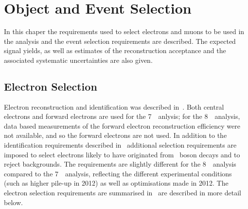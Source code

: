 \graphicspath{{Chapters/ObjEventSelection/Figures/}}
\chapter{Object and Event Selection}
\label{chap:ObjEventSelection}

In this chaper the requirements used to select electrons and muons to
be used in the analysis and the event selection requirements are described. The
expected signal yields, as well as estimates of the reconstruction acceptance
and the associated systematic uncertainties are also given.

\section{Electron Selection}
\label{sec:objsel-el}

Electron reconstruction and identification was described in~. Both
central electrons 
and forward electrons are used for the 7~\tev\ anlysis; for the 8~\tev\
analysis,
data based measurements of the forward electron reconstruction efficiency were
not available, and so the forward electrons are not used. In
addition to the identification requirements described in~
additional selection requirements are imposed to select electrons likely to have
originated from \Z\ boson decays and to reject backgrounds. The requirements are
slightly different for the 8~\tev\ analysis compared to the 7~\tev\ analysis,
reflecting the different experimental conditions (such as higher pile-up in
2012) as well as optimisations made in 2012. The electron selection requirements
are summarised in~\tab{objsel-el} are described in more detail below. 

